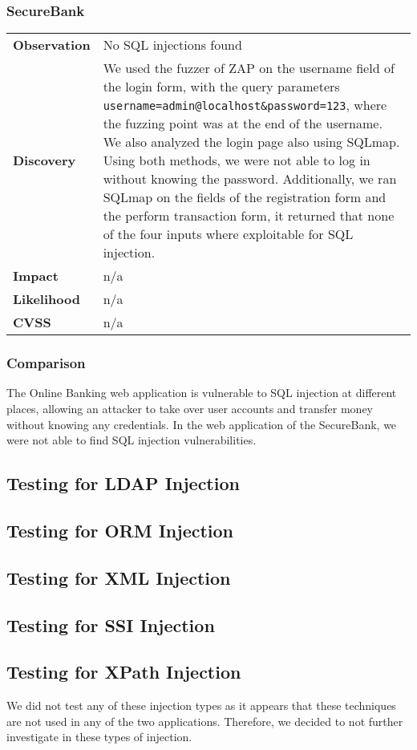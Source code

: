 \subsubsection*{SecureBank}

\begin{tabular}{l|p{10cm}}

\textbf{Observation} & No SQL injections found \\
\textbf{Discovery} & We used the fuzzer of ZAP on the username field of the login form, with the query parameters \texttt{username=admin@localhost\&password=123}, where the fuzzing point was at the end of the username. We also analyzed the login page also using SQLmap. Using both methods, we were not able to log in without knowing the password. Additionally, we ran SQLmap on the fields of the registration form and the perform transaction form, it returned that none of the four inputs where exploitable for SQL injection. \\
\textbf{Impact} & n/a \\
\textbf{Likelihood} & n/a \\
\textbf{CVSS} & n/a \\
\end{tabular}

\subsubsection*{Comparison}
The Online Banking web application is vulnerable to SQL injection at different places, allowing an attacker to take over user accounts and transfer money without knowing any credentials. In the web application of the SecureBank, we were not able to find SQL injection vulnerabilities.

\subsection{Testing for LDAP Injection}
\subsection{Testing for ORM Injection}
\subsection{Testing for XML Injection}
\subsection{Testing for SSI Injection}
\subsection{Testing for XPath Injection}
We did not test any of these injection types as it appears that these techniques are not used in any of the two applications. Therefore, we decided to not further investigate in these types of injection.

